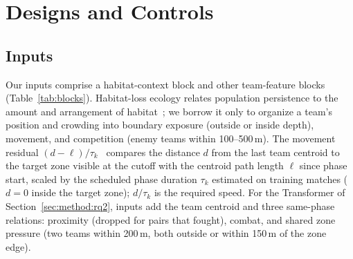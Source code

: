 \documentclass[sigconf,anonymous,nonacm]{acmart}
\begin{document}
\section{Designs and Controls}
\label{sec:method:design}
\subsection{Inputs}
\label{sec:method:representation}
Our inputs comprise a habitat-context block and other team-feature blocks (Table~\ref{tab:blocks}). Habitat-loss ecology relates population persistence to the amount and arrangement of habitat~\cite{Fahrig03}; we borrow it only to organize a team's position and crowding into boundary exposure (outside or inside depth), movement, and competition (enemy teams within 100--500\,m). The movement residual $(d-\ell)/\tau_k$~\cite{Nathan08} compares the distance $d$ from the last team centroid to the target zone visible at the cutoff with the centroid path length $\ell$ since phase start, scaled by the scheduled phase duration $\tau_k$ estimated on training matches ($d=0$ inside the target zone); $d/\tau_k$ is the required speed. For the Transformer of Section~\ref{sec:method:rq2}, inputs add the team centroid and three same-phase relations: proximity (dropped for pairs that fought), combat, and shared zone pressure (two teams within 200\,m, both outside or within 150\,m of the zone edge).
\end{document}
